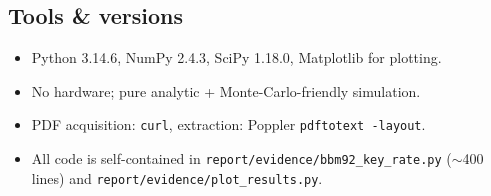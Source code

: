 \documentclass[11pt]{article}
\begin{document}
\subsection{Tools \& versions}
\begin{itemize}
\item Python 3.14.6, NumPy 2.4.3, SciPy 1.18.0, Matplotlib for plotting.
\item No hardware; pure analytic + Monte-Carlo-friendly simulation.
\item PDF acquisition: \texttt{curl}, extraction: Poppler \texttt{pdftotext -layout}.
\item All code is self-contained in
      \texttt{report/evidence/bbm92\_key\_rate.py} ($\sim$400 lines) and
      \texttt{report/evidence/plot\_results.py}.
\end{itemize}
\end{document}
